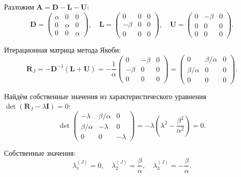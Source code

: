 \documentclass{article}
\begin{document}
Разложим $\mathbf{A} = \mathbf{D} - \mathbf{L} - \mathbf{U}$:
\begin{equation}
\mathbf{D} = \begin{pmatrix} \alpha & 0 & 0 \\ 0 & \alpha & 0 \\ 0 & 0 & \alpha \end{pmatrix}, \quad
\mathbf{L} = \begin{pmatrix} 0 & 0 & 0 \\ -\beta & 0 & 0 \\ 0 & 0 & 0 \end{pmatrix}, \quad
\mathbf{U} = \begin{pmatrix} 0 & -\beta & 0 \\ 0 & 0 & 0 \\ 0 & 0 & 0 \end{pmatrix}.
\end{equation}

Итерационная матрица метода Якоби:
\begin{equation}
\mathbf{R}_J = -\mathbf{D}^{-1}(\mathbf{L} + \mathbf{U}) = -\frac{1}{\alpha} \begin{pmatrix} 0 & -\beta & 0 \\ -\beta & 0 & 0 \\ 0 & 0 & 0 \end{pmatrix} = \begin{pmatrix} 0 & \beta/\alpha & 0 \\ \beta/\alpha & 0 & 0 \\ 0 & 0 & 0 \end{pmatrix}.
\end{equation}

Найдём собственные значения из характеристического уравнения $\det(\mathbf{R}_J - \lambda \mathbf{I}) = 0$:
\begin{equation}
\det \begin{pmatrix} -\lambda & \beta/\alpha & 0 \\ \beta/\alpha & -\lambda & 0 \\ 0 & 0 & -\lambda \end{pmatrix} = -\lambda \left(\lambda^2 - \frac{\beta^2}{\alpha^2}\right) = 0.
\end{equation}

Собственные значения:
\begin{equation}
\lambda_1^{(J)} = 0, \quad \lambda_2^{(J)} = \frac{\beta}{\alpha}, \quad \lambda_3^{(J)} = -\frac{\beta}{\alpha}.
\end{equation}
\end{document}
